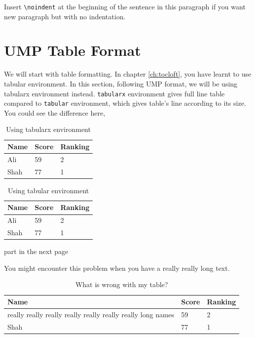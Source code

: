 \noindent Insert \verb+\noindent+ at the beginning of the sentence in this paragraph if you want new paragraph but with no indentation.

\section{UMP Table Format}
We will start with table formatting. In chapter \ref{ch:tocloft}, you have learnt to use tabular environment. In this section, following UMP format, we will be using tabularx environment instead. \verb+tabularx+ environment gives full line table compared to \verb+tabular+ environment, which gives table's line according to its size.\\

\noindent You could see the difference here,

\begin{table}[h!]
\caption{Using tabularx environment} 
\begin{tabularx}{1\linewidth}{XXX}    \addlinespace
    \toprule
    Name & Score & Ranking \\
    \toprule
    Ali & 59 & 2 \\
    Shah & 77 & 1 \\
    \bottomrule
    \end{tabularx}
\end{table}

\begin{table}[h!]
\caption{Using tabular environment}
\begin{tabular}{lll}
\toprule
    Name & Score & Ranking \\
    \toprule
    Ali & 59 & 2 \\
    Shah & 77 & 1 \\
    \bottomrule
\end{tabular}
\end{table}

\cleardoublepage %
part in the next page
 
You might encounter this problem when you have a really really long text. 

\begin{table}[h!]
\caption{What is wrong with my table?} 
\begin{tabularx}{1\linewidth}{XXX}    \addlinespace
    \toprule
    Name & Score & Ranking \\
    \toprule
    really really really really really really really long names & 59 & 2 \\
    Shah & 77 & 1 \\
    \bottomrule
    \end{tabularx}
\end{table}

